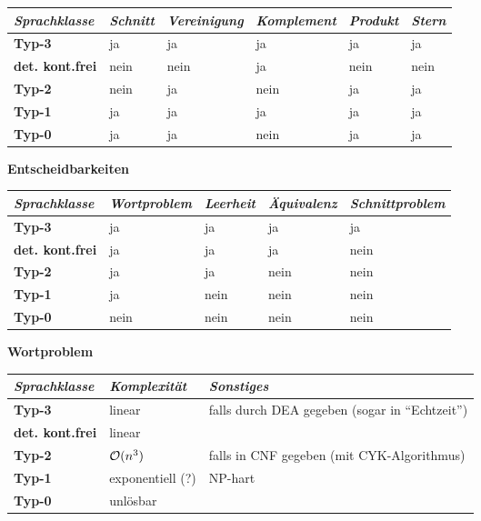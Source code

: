 \begin{tabular}{llllll}
    \toprule
    
    \emph{Sprachklasse} & \emph{Schnitt} & \emph{Vereinigung} &
    \emph{Komplement} & \emph{Produkt} & \emph{Stern} \\
    
    \midrule
    
    \textbf{Typ-3} & ja & ja & ja & ja & ja \\
    \textbf{det. kont.frei} & nein & nein & ja & nein & nein \\
    \textbf{Typ-2} & nein & ja & nein & ja & ja \\
    \textbf{Typ-1} & ja & ja & ja & ja & ja \\
    \textbf{Typ-0} & ja & ja & nein & ja & ja \\
    
    \bottomrule
\end{tabular}

\vspace{5mm}
\textbf{Entscheidbarkeiten}

\begin{tabular}{lllll}
    \toprule
    
    \emph{Sprachklasse} & \emph{Wortproblem} & \emph{Leerheit} &
    \emph{Äquivalenz} & \emph{Schnittproblem} \\
    
    \midrule
    
    \textbf{Typ-3} & ja & ja & ja & ja \\
    \textbf{det. kont.frei} & ja & ja & ja & nein \\
    \textbf{Typ-2} & ja & ja & nein & nein \\
    \textbf{Typ-1} & ja & nein & nein & nein \\
    \textbf{Typ-0} & nein & nein & nein & nein \\
    
    \bottomrule
\end{tabular}

\vspace{5mm}
\textbf{Wortproblem}

\begin{tabular}{lll}
    \toprule
    
    \emph{Sprachklasse} & \emph{Komplexität} & \emph{Sonstiges} \\
    
    \midrule
    
    \textbf{Typ-3} & linear &
    falls durch DEA gegeben (sogar in "`Echtzeit"') \\
    \textbf{det. kont.frei} & linear & \\
    \textbf{Typ-2} & $\mathcal{O}(n^3)$ & falls in CNF gegeben (mit CYK-Algorithmus) \\
    \textbf{Typ-1} & exponentiell (?) & NP-hart \\
    \textbf{Typ-0} & unlösbar & \\
    
    \bottomrule
\end{tabular}

\pagebreak
